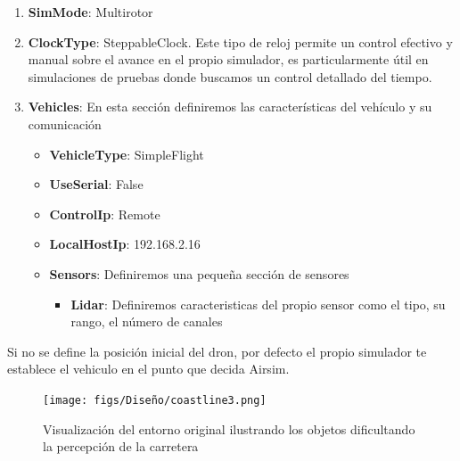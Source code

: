 \begin{enumerate}
  \item \textbf{SimMode}: Multirotor
  \item \textbf{ClockType}: SteppableClock. Este tipo de reloj permite un control efectivo y manual sobre el avance en el propio simulador, es particularmente útil en simulaciones
  de pruebas donde buscamos un control detallado del tiempo.
  \item \textbf{Vehicles}: En esta sección definiremos las características del vehículo y su comunicación
  \begin{itemize}
    \item \textbf{VehicleType}: SimpleFlight
    \item \textbf{UseSerial}: False
    \item \textbf{ControlIp}: Remote
    \item \textbf{LocalHostIp}: 192.168.2.16
    \item \textbf{Sensors}: Definiremos una pequeña sección de sensores
      \begin{itemize}
        \item \textbf{Lidar}: Definiremos caracteristicas del propio sensor como el tipo, su rango, el número de canales
      \end{itemize}
  \end{itemize}
\end{enumerate}

Si no se define la posición inicial del dron, por defecto el propio simulador te establece el vehiculo en el punto que decida Airsim. 


\begin{figure} [H]
  \begin{center}
    \texttt{[image: figs/Diseño/coastline3.png]}
  \end{center}
  \caption{Visualización del entorno original ilustrando los objetos dificultando la
  percepción de la carretera}
  \label{fig:CoastlineModificado}
\end{figure}\

